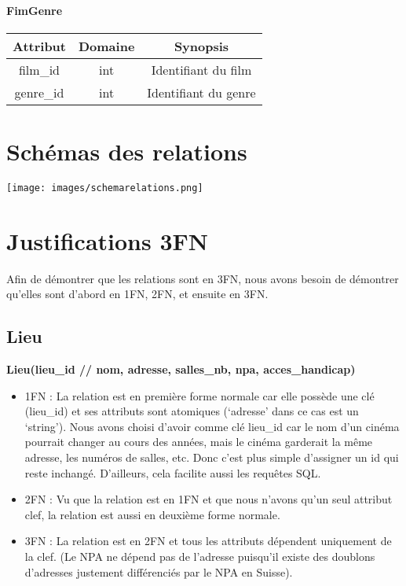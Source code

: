 \documentclass[12pt]{article}
\begin{document}
\paragraph*{FimGenre}
\begin{center}
    \begin{tabular}{||c c c||} 
     \hline
     Attribut & Domaine & Synopsis\\ [0.5ex] 
     \hline\hline
     film\_id & int & Identifiant du film \\ 
     \hline
     genre{\_}id & int & Identifiant du genre \\
     \hline
    \end{tabular}
\end{center}
\pagebreak
\section{Schémas des relations}
\texttt{[image: images/schemarelations.png]}
\pagebreak
\section{Justifications 3FN}
Afin de démontrer que les relations sont en 3FN, 
nous avons besoin de démontrer qu'elles sont d'abord en 1FN, 2FN, et ensuite en 3FN.
\subsection{Lieu}
\textbf{Lieu(lieu{\_}id // nom, adresse, salles{\_}nb, npa, acces{\_}handicap)}
\begin{itemize}
    \item 1FN : La relation est en première forme normale car elle possède une clé (lieu{\_}id) 
    et ses attributs sont atomiques (‘adresse’ dans ce cas est un ‘string’). 
    Nous avons choisi d’avoir comme clé lieu{\_}id car le nom d’un cinéma pourrait 
    changer au cours des années, mais le cinéma garderait la même adresse, les numéros de salles, etc. 
    Donc c’est plus simple d’assigner un id qui reste inchangé. D’ailleurs, cela facilite aussi les requêtes SQL.
    \item 2FN : Vu que la relation est en 1FN et que nous n'avons qu'un seul attribut clef, la relation est aussi
    en deuxième forme normale.
    \item 3FN : La relation est en 2FN et tous les attributs dépendent uniquement de la clef. (Le NPA ne dépend pas de l'adresse
    puisqu'il existe des doublons d'adresses justement différenciés par le NPA en Suisse).
\end{itemize}
\end{document}
